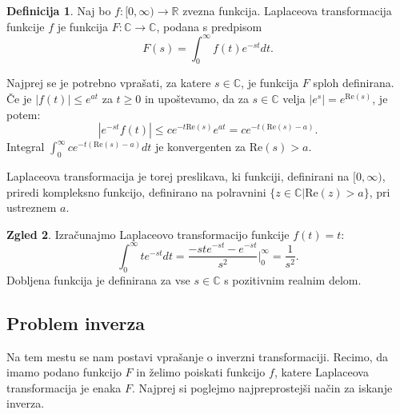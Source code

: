 \documentclass[12pt,a4paper]{amsart}
\theoremstyle{definition} %
\newtheorem{definicija}{Definicija}[section]
\newtheorem{zgled}[definicija]{Zgled}
\theoremstyle{plain} %
\newcommand{\R}{\mathbb R}
\newcommand{\C}{\mathbb C}
\begin{document}
\begin{definicija}
    Naj bo $f:[0,\infty) \to \R$ zvezna funkcija. Laplaceova transformacija funkcije $f$ je funkcija
    $F:\C\to\C$, podana s predpisom
    \[ F(s)=\int_{0}^{\infty}f(t)e^{-st}dt.\]
\end{definicija}

\noindent Najprej se je potrebno vprašati, za katere $s\in\C$, je funkcija $F$ sploh definirana. Če je
$|f(t)|\leq e^{at}$ za $t\geq0$ in upoštevamo, da za $s\in\C$ velja $|e^{s}|=e^{\text{Re}(s)}$, je potem:
\[|e^{-st}f(t)| \leq ce^{-t\text{Re}(s)}e^{at}=ce^{-t(\text{Re}(s)-a)}.\]
Integral $\int_0^{\infty}ce^{-t(\text{Re}(s)-a)}dt$ je konvergenten za $\text{Re}(s)>a$.

Laplaceova transformacija je torej preslikava, ki funkciji, definirani na $[0,\infty)$, priredi
kompleksno funkcijo, definirano na polravnini $\{z\in\C | \text{Re}(z)>a\}$, pri ustreznem $a$.

\begin{zgled}
    Izračunajmo Laplaceovo transformacijo funkcije $f(t)=t$:
    \[\int_0^{\infty}te^{-st}dt = \frac{-ste^{-st}-e^{-st}}{s^2}\Bigr|_{0}^{\infty}=\frac{1}{s^2}.\]
    Dobljena funkcija je definirana za vse $s\in\C$ s pozitivnim realnim delom.
\end{zgled}

\subsection{Problem inverza}
Na tem mestu se nam postavi vprašanje o inverzni transformaciji. Recimo, da imamo podano funkcijo
$F$ in želimo poiskati funkcijo $f$, katere Laplaceova transformacija je enaka $F$. Najprej si poglejmo
najpreprostejši način za iskanje inverza.
\end{document}
